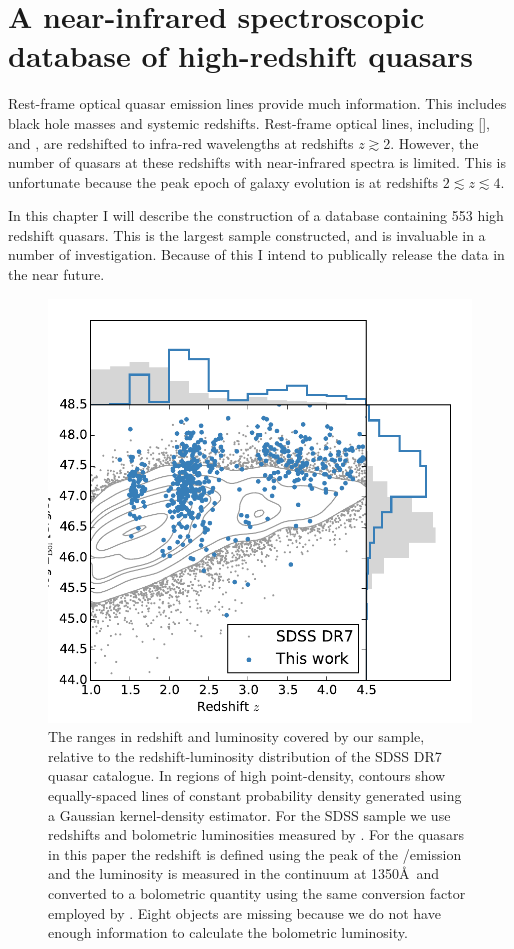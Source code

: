 \chapter{A near-infrared spectroscopic database of high-redshift quasars}\label{ch:chapter02}

Rest-frame optical quasar emission lines provide much information. 
This includes black hole masses and systemic redshifts. 
Rest-frame optical lines, including [], \hb and \ha, are redshifted to infra-red wavelengths at redshifts $z\gtrsim$2. 
However, the number of quasars at these redshifts with near-infrared spectra is limited. 
This is unfortunate because the peak epoch of galaxy evolution is at redshifts $2\lesssim z \lesssim 4$. 

In this chapter I will describe the construction of a database containing 553 high redshift quasars. 
This is the largest sample constructed, and is invaluable in a number of investigation. 
Because of this I intend to publically release the data in the near future. 

\begin{figure}
    \includegraphics[width=0.8\columnwidth]{figures/chapter02/luminosity_z.pdf} 
    \caption{The ranges in redshift and luminosity covered by our sample, relative to the redshift-luminosity distribution of the SDSS DR7 quasar catalogue. In regions of high point-density, contours show equally-spaced lines of constant probability density generated using a Gaussian kernel-density estimator. For the SDSS sample we use \citet{hewett10} redshifts and bolometric luminosities measured by \citet{shen11}. For the quasars in this paper the redshift is defined using the peak of the \hans/\hb emission and the luminosity is measured in the continuum at 1350\AA\, and converted to a bolometric quantity using the same conversion factor employed by \citet{shen11}. Eight objects are missing because we do not have enough information to calculate the bolometric luminosity.}     
    \label{fig:lzplane}
\end{figure}

